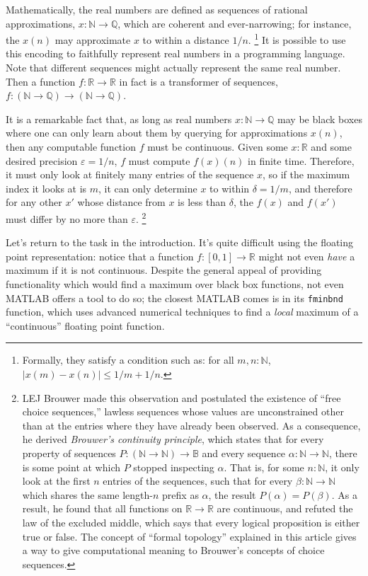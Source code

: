 \documentclass{article}
\newcommand{\nat}{\mathbb{N}}
\newcommand{\rat}{\mathbb{Q}}
\newcommand{\R}{\mathbb{R}}
\newcommand{\bool}{\mathbb{B}}
\begin{document}
Mathematically, the real numbers are defined as sequences of rational approximations, $x : \nat \to \rat$, which are coherent and ever-narrowing; for instance, the $x(n)$ may approximate $x$ to within a distance $1/n$. \footnote{Formally, they satisfy a condition such as: for all $m, n : \nat$, $|x(m) - x(n)| \le 1/m + 1/n$.} It is possible to use this encoding to faithfully represent real numbers in a programming language. Note that different sequences might actually represent the same real number. Then a function $f : \R \to \R$ in fact is a transformer of sequences, $f : (\nat \to \rat) \to (\nat \to \rat)$.

It is a remarkable fact that, as long as real numbers $x : \nat \to \rat$ may be black boxes where one can only learn about them by querying for approximations $x(n)$, then any computable function $f$ must be continuous. Given some $x : \R$ and some desired precision $\varepsilon = 1 / n$, $f$ must compute $f(x)(n)$ in finite time. Therefore, it must only look at finitely many entries of the sequence $x$, so if the maximum index it looks at is $m$, it can only determine $x$ to within $\delta = 1 / m$, and therefore for any other $x'$ whose distance from $x$ is less than $\delta$, the $f(x)$ and $f(x')$ must differ by no more than $\varepsilon$.
\footnote{LEJ Brouwer made this observation and postulated the existence of ``free choice sequences,'' lawless sequences whose values are unconstrained other than at the entries where they have already been observed. As a consequence, he derived \emph{Brouwer's continuity principle}, which states that for every property of sequences $P : (\nat \to \nat) \to \bool$ and every sequence $\alpha : \nat \to \nat$, there is some point at which $P$ stopped inspecting $\alpha$. That is, for some $n : \nat$, it only look at the first $n$ entries of the sequences, such that for every $\beta : \nat \to \nat$ which shares the same length-$n$ prefix as $\alpha$, the result $P(\alpha) = P(\beta)$. As a result, he found that all functions on $\R \to \R$ are continuous, and refuted the law of the excluded middle, which says that every logical proposition is either true or false. The concept of ``formal topology'' explained in this article gives a way to give computational meaning to Brouwer's concepts of choice sequences.}

Let's return to the task in the introduction. It's quite difficult using the floating point representation: notice that a function $f : [0,1] \to \R$ might not even \emph{have} a maximum if it is not continuous. Despite the general appeal of providing functionality which would find a maximum over black box functions, not even MATLAB offers a tool to do so; the closest MATLAB comes is in its \texttt{fminbnd} function, which uses advanced numerical techniques to find a \emph{local} maximum of a ``continuous'' floating point function.
\end{document}
